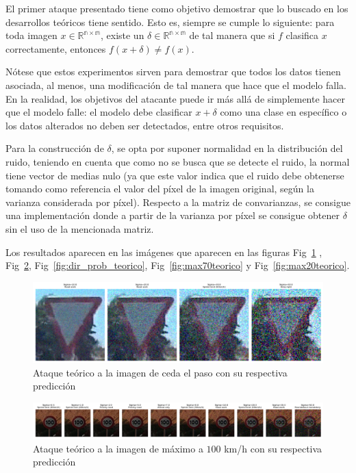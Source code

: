 El primer ataque presentado tiene como objetivo demostrar que lo buscado en los desarrollos teóricos tiene sentido. Esto es, siempre se cumple lo siguiente: para toda imagen $x \in \mathbb{R^{n \times m}}$, existe un $\delta \in \mathbb{R^{n \times m}}$ de tal manera que si $f$ clasifica $x$ correctamente, entonces $f(x + \delta) \neq f(x)$.

Nótese que estos experimentos sirven para demostrar que todos los datos tienen asociada, al menos, una modificación de tal manera que hace que el modelo falla. En la realidad, los objetivos del atacante puede ir más allá de simplemente hacer que el modelo falle: el modelo debe clasificar $x+\delta$ como una clase en específico o los datos alterados no deben ser detectados, entre otros requisitos.

Para la construcción de $\delta$, se opta por suponer normalidad en la distribución del ruido, teniendo en cuenta que como no se busca que se detecte el ruido, la normal tiene vector de medias nulo (ya que este valor indica que el ruido debe obtenerse tomando como referencia el valor del píxel de la imagen original, según la varianza considerada por píxel). Respecto a la matriz de convarianzas, se consigue una implementación donde a partir de la varianza por píxel se consigue obtener $\delta$ sin el uso de la mencionada matriz.

Los resultados aparecen en las imágenes que aparecen en las figuras Fig~\ref{fig:cedapasoteorico}
, Fig~\ref{fig:max100teorico}, Fig~\ref{fig:dir_prob_teorico}, Fig~\ref{fig:max70teorico} y Fig~\ref{fig:max20teorico}.


\begin{figure}[H]
    \centering
        \centering
        \includegraphics[width=\textwidth]{img/cedaPasoTeorico.png}
        \caption{Ataque teórico a la imagen de ceda el paso con su respectiva predicción}
        \label{fig:cedapasoteorico}
\end{figure}

\begin{figure}[H]
    \centering
        \centering
        \includegraphics[width=\textwidth]{img/max_100_teorico.png}
        \caption{Ataque teórico a la imagen de máximo a $100$ km/h con su respectiva predicción}
        \label{fig:max100teorico}
\end{figure}

